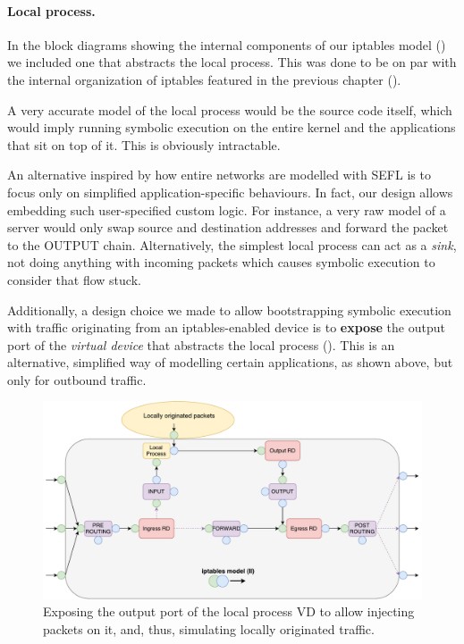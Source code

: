 \paragraph{Local process.}
In the block diagrams showing the internal components of our iptables model
() we included one that abstracts the
local process.  This was done to be on par with the internal organization of
iptables featured in the previous chapter
().

A very accurate model of the local process would be the source code itself,
which would imply running symbolic execution on the entire kernel and the
applications that sit on top of it.  This is obviously intractable.

An alternative inspired by how entire networks are modelled with SEFL is to
focus only on simplified application-specific behaviours.  In fact, our design
allows embedding such user-specified custom logic.  For instance, a very raw
model of a server would only swap source and destination addresses and forward
the packet to the OUTPUT chain.  Alternatively, the simplest local process can
act as a \emph{sink}, not doing anything with incoming packets which causes
symbolic execution to consider that flow stuck.

Additionally, a design choice we made to allow bootstrapping symbolic execution
with traffic originating from an iptables-enabled device is to \textbf{expose}
the output port of the \emph{virtual device} that abstracts the local process
().  This is an alternative,
simplified way of modelling certain applications, as shown above, but only for
outbound traffic.

\begin{figure}[h]
  \centering
  \captionsetup{justification=centering}
  \includegraphics[scale=0.4]{assets/img/local-process-out}
  \caption[Exposing the output port of the local process VD.]{Exposing the
  output port of the local process VD to allow injecting packets on it, and,
  thus, simulating locally originated traffic.}
  \label{fig:local-process-out}
\end{figure}


